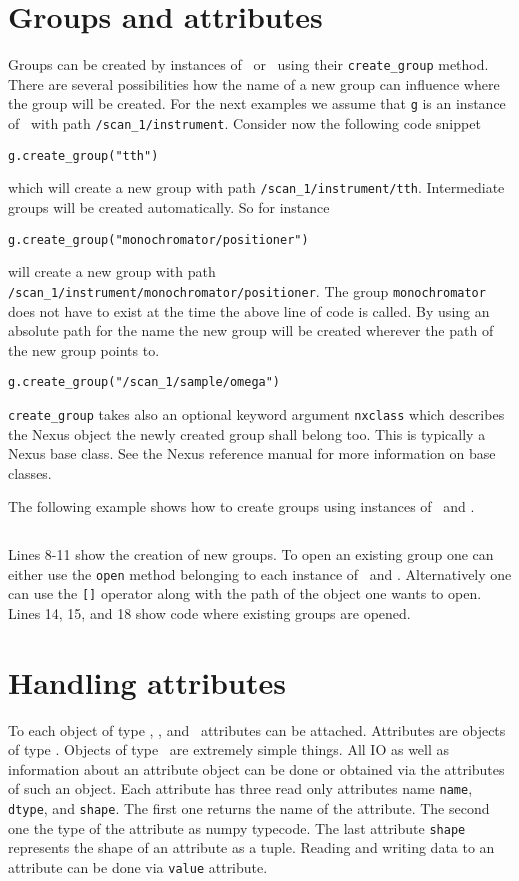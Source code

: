 \section{Groups and attributes}
Groups can be created by instances of \nxgroup\ or \nxfile\ using their 
{\tt create\_group} method.
There are several possibilities how the name of a new group can influence where
the group will be created. For the next examples we assume that {\tt g} is an
instance of \nxgroup\ with path {\tt /scan\_1/instrument}. 
Consider now the following code snippet
\begin{verbatim}
g.create_group("tth")
\end{verbatim}
which will create a new group with path {\tt /scan\_1/instrument/tth}.
Intermediate groups will be created automatically. So for instance 
\begin{verbatim}
g.create_group("monochromator/positioner")
\end{verbatim}
will create a new group with path {\tt
/scan\_1/instrument/monochromator/positioner}. The group {\tt monochromator} 
does not have to exist at the time the above line of code is called. 
By using an absolute path for the name the new group will be created wherever
the path of the new group points to. 
\begin{verbatim}
g.create_group("/scan_1/sample/omega")
\end{verbatim}
{\tt create\_group} takes also an optional keyword argument {\tt nxclass} which
describes the Nexus object the newly created group shall belong too. This is
typically a Nexus base class. See the Nexus reference manual for more
information on base classes.

The following example shows how to create groups using instances of \nxgroup\
and \nxfile.
\inputminted[linenos=true]{python}{../examples/nxgroup_ex1.py}
Lines 8-11 show the creation of new groups. To open an existing group one can
either use the {\tt open} method belonging to each instance of \nxgroup\ and 
\nxfile. Alternatively one can use the {\tt []} operator along with the path of
the object one wants to open. Lines 14, 15, and 18 show code where existing
groups are opened.

\section{Handling attributes}

To each object of type \nxgroup, \nxfile, and \nxfield\ attributes can be
attached. Attributes are objects of type \nxattribute. 
Objects of type \nxattribute\ are extremely simple things. All IO as well as
information about an attribute object can be done or obtained via the attributes
of such an object. 
Each attribute has three read only attributes name {\tt name}, {\tt dtype}, and
{\tt shape}. The first one returns the name of the attribute. The second one the
type of the attribute as numpy typecode. The last attribute {\tt shape}
represents the shape of an attribute as a tuple.
Reading and writing data to an attribute can be done via {\tt value} attribute.

